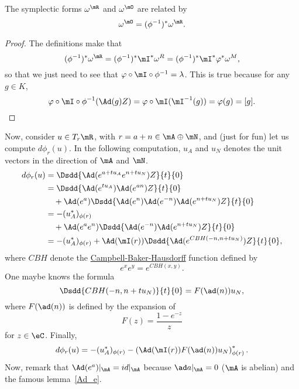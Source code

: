 \begin{lemma}\label{lem:om_O_om_R}
The symplectic forms $\omega^{\mR}$ and $\omega^{\mO}$ are related by
\begin{equation}
\omega^{\mO}=(\phi^{-1})^*\omega^{\mR}.
\end{equation}
\end{lemma}

\begin{proof}
The definitions make that
\begin{equation}
  (\phi^{-1})^*\omega^{\mR}=(\phi^{-1})^*\mI^*\omega^R
                          =(\phi^{-1})^*\mI^*\varphi^*\omega^M,
\end{equation}
so that we just need to see that $\varphi\circ\mI\circ\phi^{-1}=\lambda$. This is true because for any $g\in K$,
\[
   \varphi\circ\mI\circ\phi^{-1}(\Ad(g)Z)=\varphi\circ\mI(\mI^{-1}(g))=\varphi(g)=[g].
\]

\end{proof}

Now, consider $u\in T_r\mR$, with $r=a+n\in\mA\oplus\mN$, and (just for fun) let us compute $d\phi_r(u)$. In the following computation, $u_A$ and $u_N$ denotes the unit vectors in the direction of $\mA$ and $\mN$.
\begin{equation}
\begin{split}
   d\phi_r(u)&=\Dsdd{  \Ad(e^{a+tu_A}e^{n+tu_N})Z  }{t}{0}\\
             &=\Dsdd{ \Ad(e^{tu_A})\Ad(e^{an})Z  }{t}{0}\\
             &\quad+\Ad(e^a)\Dsdd{  \Ad(e^n)\Ad(e^{-n})\Ad(e^{n+tu_N})Z  }{t}{0}\\
	     &=-(u_A^*)_{\phi(r)}\\
	     &\quad+\Ad(e^ae^n)\Dsdd{ \Ad(e^{-n})\Ad( e^{n+tu_N} )Z  }{t}{0}\\
	     &=-(u_A^*)_{\phi(r)}+\Ad(\mI(r))\Dsdd{  \Ad(e^{ CBH(-n,n+tu_N) })Z  }{t}{0},
\end{split}
\end{equation}
where $CBH$ denote the \href{http://en.wikipedia.org/wiki/Baker-Campbell-Hausdorff_formula}{Campbell-Baker-Hausdorff} function defined by
\[
   e^xe^y=e^{CBH(x,y)}.
\]
One maybe knows the formula
\begin{equation}
\Dsdd{  CBH(-n,n+tu_N)  }{t}{0}=F(\ad(n))u_N,
\end{equation}
where $F(\ad(n))$ is defined by the expansion of
\[
F(z)=\frac{1-e^{-z}}{z}
\]
for $z\in\eC$. Finally,
\begin{equation}
d\phi_r(u)=-(u_A^*)_{\phi(r)}-\left(  \Ad(\mI(r))F(\ad(n))u_N  \right)^*_{\phi(r)}.
\end{equation}
Now, remark that $\Ad(e^a)|_{\mA}=id|_{\mA}$ because $\ad a|_{\mA}=0$ ($\mA$ is abelian) and
the famous lemma~\ref{Ad_e}.

